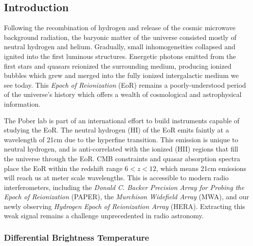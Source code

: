\documentclass[a0,landscape]{a0poster}
\begin{document}
\begin{multicols}{4}

\color{DarkSlateGray}  %

\section*{Introduction}
Following the recombination of hydrogen and release of the cosmic microwave background radiation, the baryonic matter of the universe consisted mostly of neutral hydrogen and helium. Gradually, small inhomogeneities collapsed and ignited into the first luminous structures. Energetic photons emitted from the first stars and quasars reionized the surrounding medium, producing ionized bubbles which grew and merged into the fully ionized intergalactic medium we see today. This \emph{Epoch of Reionization} (EoR) remains a poorly-understood period of the universe's history which offers a wealth of cosmological and astrophysical information.

The Pober lab is part of an international effort to build instruments capable of studying the EoR. The neutral hydrogen (HI) of the EoR emits faintly at a wavelength of 21cm due to the hyperfine transition. This emission is unique to neutral hydrogen, and is anti-correlated with the ionized (HII) regions that fill the universe through the EoR. CMB constraints and quasar absorption spectra place the EoR within the redshift range $6 < z < 12$, which means 21cm emissions will reach us at meter scale wavelengths. This is accessible to modern radio interferometers, including the \emph{Donald C. Backer Precision Array for Probing the Epoch of Reionization} (PAPER), the \emph{Murchison Widefield Array} (MWA), and our newly observing \emph{Hydrogen Epoch of Reionization Array} (HERA). Extracting this weak signal remains a challenge unprecedented in radio astronomy.



\subsubsection*{Differential Brightness Temperature}


\end{multicols}
\end{document}
